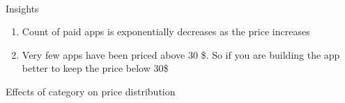 \documentclass[11pt]{article}
\providecommand{\tightlist}{%
      \setlength{\itemsep}{0pt}\setlength{\parskip}{0pt}}
\begin{document}
    \begin{center}
    \end{center}
    { \hspace*{\fill} \\}
    
    Insights

\begin{enumerate}
\def\labelenumi{\arabic{enumi}.}
\tightlist
\item
  Count of paid apps is exponentially decreases as the price increases
\item
  Very few apps have been priced above 30 \$. So if you are building the
  app better to keep the price below 30\$
\end{enumerate}

    Effects of category on price distribution
\end{document}
